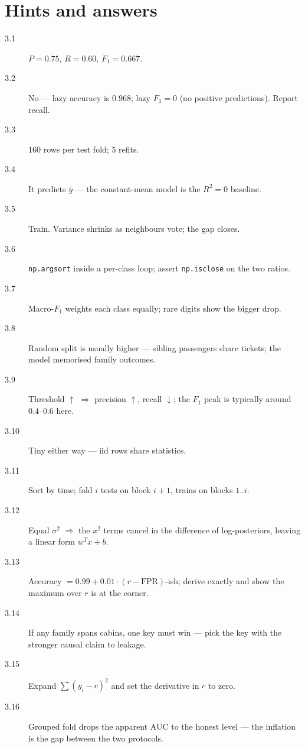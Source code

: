 \section*{Hints and answers}
\begin{description}
\item[3.1] $P{=}0.75$, $R{=}0.60$, $F_1{=}0.667$.
\item[3.2] No --- lazy accuracy is $0.968$; lazy $F_1{=}0$ (no positive
  predictions). Report recall.
\item[3.3] $160$ rows per test fold; $5$ refits.
\item[3.4] It predicts $\bar y$ --- the constant-mean model is the $R^2{=}0$
  baseline.
\item[3.5] Train. Variance shrinks as neighbours vote; the gap closes.
\item[3.6] \texttt{np.argsort} inside a per-class loop; assert
  \texttt{np.isclose} on the two ratios.
\item[3.7] Macro-$F_1$ weights each class equally; rare digits show the
  bigger drop.
\item[3.8] Random split is usually higher --- sibling passengers share
  tickets; the model memorised family outcomes.
\item[3.9] Threshold $\uparrow$ $\Rightarrow$ precision $\uparrow$, recall
  $\downarrow$; the $F_1$ peak is typically around $0.4$--$0.6$ here.
\item[3.10] Tiny either way --- iid rows share statistics.
\item[3.11] Sort by time; fold $i$ tests on block $i{+}1$, trains on
  blocks $1..i$.
\item[3.12] Equal $\sigma^2$ $\Rightarrow$ the $x^2$ terms cancel in the
  difference of log-posteriors, leaving a linear form $w^Tx + b$.
\item[3.13] Accuracy $= 0.99 + 0.01\cdot(r - \text{FPR})$-ish; derive
  exactly and show the maximum over $r$ is at the corner.
\item[3.14] If any family spans cabins, one key must win --- pick the key
  with the stronger causal claim to leakage.
\item[3.15] Expand $\sum(y_i - c)^2$ and set the derivative in $c$ to
  zero.
\item[3.16] Grouped fold drops the apparent AUC to the honest level ---
  the inflation is the gap between the two protocols.
\end{description}
